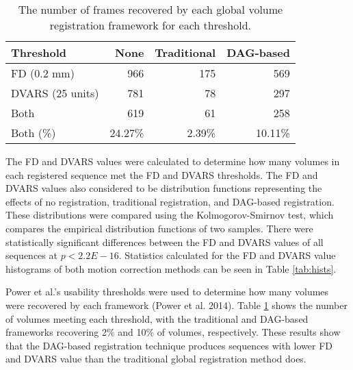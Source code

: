 \begin{table}[th]
\centering
\caption{The number of frames recovered by each global volume registration framework for each threshold.}
\label{tab:thresholds}
\begin{tabular}{|l|r|r|r|}
\hline
\textbf{Threshold} & \textbf{None} & \textbf{Traditional} & \textbf{DAG-based} \\ \hline
FD (0.2 mm)        & 966           & 175                  & 569                \\ \hline
DVARS (25 units)   & 781           & 78                   & 297                \\ \hline
Both               & 619           & 61                   & 258                \\ \hline
Both (\%)          & 24.27\%       & 2.39\%               & 10.11\%            \\ \hline
\end{tabular}
\end{table}


The FD and DVARS values were calculated to determine how many volumes in each registered sequence met the FD and DVARS thresholds. The FD and DVARS values also considered to be distribution functions representing the effects of no registration, traditional registration, and DAG-based registration. These distributions were compared using the Kolmogorov-Smirnov test, which compares the empirical distribution functions of two samples. There were statistically significant differences between the FD and DVARS values of all sequences at $p < 2.2E-16$. Statistics calculated for the FD and DVARS value histograms of both motion correction methods can be seen in Table \ref{tab:hists}.

Power et al.’s usability thresholds were used to determine how many volumes were recovered by each framework (Power et al. 2014). Table \ref{tab:thresholds} shows the number of volumes meeting each threshold, with the traditional and DAG-based frameworks recovering 2\% and 10\% of volumes, respectively. These results show that the DAG-based registration technique produces sequences with lower FD and DVARS value than the traditional global registration method does.
